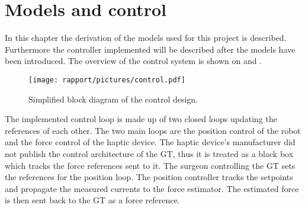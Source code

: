 \chapter{Models and control}
In this chapter the derivation of the models used for this project is described. Furthermore the controller implemented will be described after the models have been introduced. The overview of the control system is shown on  and .
 
\begin{figure}[H]
	\texttt{[image: rapport/pictures/control.pdf]} 
	\caption{Simplified block diagram of the control design.}
	\label{fig:simple_control}
\end{figure}

The implemented control loop is made up of two closed loops updating the references of each other. The two main loops are the position control of the robot and the force control of the haptic device. The haptic device's manufacturer did not publish the control architecture of the GT, thus it is treated as a black box which tracks the force references sent to it. The surgeon controlling the GT sets the references for the position loop. The position controller tracks the setpoints and propagate the measured currents to the force estimator. The estimated force is then sent back to the GT as a force reference. 











